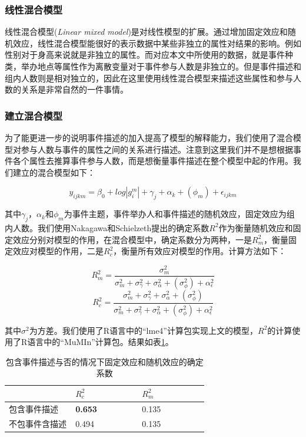 \subsubsection{线性混合模型}

线性混合模型(\textit{Linear mixed model})是对线性模型的扩展。通过增加固定效应和随机效应，线性混合模型能很好的表示数据中某些非独立的属性对结果的影响。例如性别对于身高来说就是非独立的属性。而对应本文中所使用的数据，就是事件种类，举办地点等属性作为离散变量对于事件参与人数是非独立的。但是事件描述和组内人数则是相对独立的，因此在这里使用线性混合模型来描述这些属性和参与人数的关系是非常自然的一件事情。

\subsubsection{建立混合模型}

为了能更进一步的说明事件描述的加入提高了模型的解释能力，我们使用了混合模型对参与人数与事件的属性之间的关系进行描述。注意到这里我们并不是想根据事件各个属性去推算事件参与人数，而是想衡量事件描述在整个模型中起的作用。我们建立的混合模型如下：

\begin{equation}
y_{ijkm}=\beta_0+log|g_i^m|+\gamma_j+\alpha_k+ (\phi_m) +\epsilon_{ijkm}
\end{equation}

其中\(\gamma_j\)，\(\alpha_k\)和\(\phi_m\)为事件主题，事件举办人和事件描述的随机效应，固定效应为组内人数。我们使用Nakagawa和Schielzeth\citep{nakagawa_ageneralandsimplemethodforobtaining_2013}提出的确定系数\(R^2\)作为衡量随机效应和固定效应分别对模型的作用，在混合模型中，确定系数分为两种，一是\(R_m^2\)，衡量固定效应对模型的作用，二是\(R_c^2\)，衡量所有效应对模型的作用。计算方法如下：

\begin{equation}
R_m^2=\frac{\sigma_m^2}{\sigma_m^2+\sigma_\gamma^2+\sigma_\alpha^2+(\sigma_\phi^2)+\alpha_\epsilon^2}
\end{equation}
\begin{equation}
R_c^2=\frac{\sigma_m^2+\sigma_\gamma^2+\sigma_\alpha^2+(\sigma_\phi^2)}{\sigma_m^2+\sigma_\gamma^2+\sigma_\alpha^2+(\sigma_\phi^2)+\alpha_\epsilon^2}
\end{equation}

其中\(\sigma^2\)为方差。我们使用了R语言中的``lme4''计算包\citep{lme4}实现上文的模型，\(R^2\)的计算使用了R语言中的``MuMIn''计算包\citep{MuMIn}。结果如表\ref{t1-4}。



\begin{table}[h]
  \caption{\label{t1-4}包含事件描述与否的情况下固定效应和随机效应的确定系数}
	\centering  
    \begin{tabular*}{\linewidth}{p{0.33\linewidth}p{0.33\linewidth}p{0.33\linewidth}}
  \toprule
    &  \(R_c^2\) & \(R_m^2\) \\ 
  \midrule
		包含事件描述                       & \textbf{0.653} & 0.135 \\ 
    不包事件含描述                        & 0.494 & 0.135 \\ 
  \bottomrule
    \end{tabular*}
\end{table}

